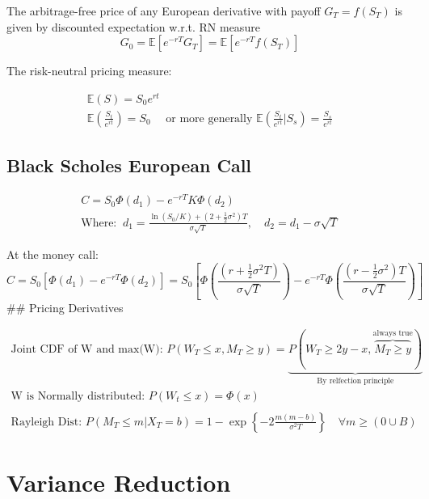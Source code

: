 \documentclass[
  oneside]{book}
\begin{document}
The arbitrage-free price of any European derivative with payoff \(G_T=f\left(S_T\right)\) is given by discounted expectation w.r.t. RN measure
\[
G_0=\mathbb{E}\left[e^{-r T} G_T\right]=\mathbb{E}\left[e^{-r T} f\left(S_T\right)\right]
\]

The risk-neutral pricing measure:

\[
\begin{gathered}
\mathbb{E}(S) = S_{0}e^{rt}\\
\mathbb{E}\left( \frac{S_{t}}{e^{rt}}\right) = S_{0} \quad \text{ or more generally } \mathbb{E}\left( \frac{S_{t}}{e^{rt}} |S_{s} \right) = \frac{S_{s}}{e^{rt}}
\end{gathered}
\]

\hypertarget{black-scholes-european-call}{%
\subsection{Black Scholes European Call}\label{black-scholes-european-call}}

\[
\begin{gathered}
C = S_{0}\Phi(d_{1}) - e^{-rT}K\Phi(d_{2})\\
\text{Where: }\ d_{1} = \frac{\ln(S_{0}/K)+\left( 2+\frac{1}{2}\sigma^{2} \right)T}{\sigma \sqrt{ T }}, \quad d_{2} = d_{1}-\sigma \sqrt{ T }
\end{gathered}
\]

At the money call:
\[
C = S_{0}\left[ \Phi(d_{1}) -e^{-rT}\Phi(d_{2}) \right] = S_{0} \left[ \Phi \left( \frac{\left( r+\frac{1}{2}\sigma^{2}T \right)}{\sigma \sqrt{ T }} \right) -e^{-rT}\Phi \left( \frac{\left( r-\frac{1}{2}\sigma^{2} \right)T}{\sigma \sqrt{ T }} \right)  \right] 
\]
\#\# Pricing Derivatives

\[
\begin{gathered}
\text{Joint CDF of W and max(W): } P(W_{T}\leq x, M_{T}\geq y) = \underbrace{ P(W_{T}\geq 2y-x, \overbrace{ M_{T}\geq y }^{ \text{always true} }) }_{\text{By relfection principle} }\\
\text{W is Normally distributed: } P(W_{t} \leq x) = \Phi(x)\\
\\
\text{Rayleigh Dist: } P(M_{T}\leq m | X_{T} = b) = 1 - \exp \left\{ -2 \frac{m(m-b)}{\sigma^{2}T} \right\}  \quad \forall m\geq (0 \cup B) 
\end{gathered}
\]

\hypertarget{variance-reduction-1}{%
\section{Variance Reduction}\label{variance-reduction-1}}
\end{document}
